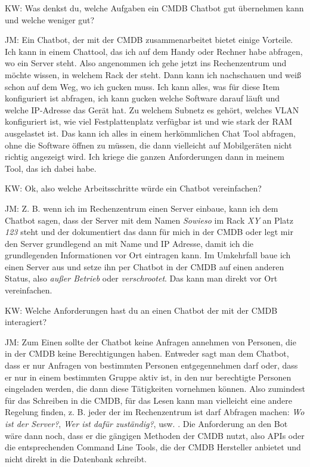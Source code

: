 \begin{list}{X:}{\setlength{\labelsep}{5mm}}
\item[KW:] Was denkst du, welche Aufgaben ein CMDB Chatbot gut übernehmen kann und welche weniger gut?
\item[JM:] Ein Chatbot, der mit der CMDB zusammenarbeitet bietet einige Vorteile. Ich kann in einem Chattool, das ich auf dem Handy oder Rechner habe abfragen, wo ein Server steht. Also angenommen ich gehe jetzt ins Rechenzentrum und möchte wissen, in welchem Rack der steht. Dann kann ich nachschauen und weiß schon auf dem Weg, wo ich gucken muss. Ich kann alles, was für diese Item konfiguriert ist abfragen, ich kann gucken welche Software darauf läuft und welche IP-Adresse das Gerät hat. Zu welchem Subnetz es gehört, welches VLAN konfiguriert ist, wie viel Festplattenplatz verfügbar ist und wie stark der RAM ausgelastet ist. Das kann ich alles in einem herkömmlichen Chat Tool abfragen, ohne die Software öffnen zu müssen, die dann vielleicht auf Mobilgeräten nicht richtig angezeigt wird. Ich kriege die ganzen Anforderungen dann in meinem Tool, das ich dabei habe.
\item[KW:] Ok, also welche Arbeitsschritte würde ein Chatbot vereinfachen?
\item[JM:] Z. B. wenn ich im Rechenzentrum einen Server einbaue, kann ich dem Chatbot sagen, dass der Server mit dem Namen \textit{Sowieso} im Rack \textit{XY} an Platz \textit{123} steht und der dokumentiert das dann für mich in der CMDB oder legt mir den Server grundlegend an mit Name und IP Adresse, damit ich die grundlegenden Informationen vor Ort eintragen kann. Im Umkehrfall baue ich einen Server aus und setze ihn per Chatbot in der CMDB auf einen anderen Status, also \textit{außer Betrieb} oder \textit{verschrootet}. Das kann man direkt vor Ort vereinfachen.
\item[KW:] Welche Anforderungen hast du an einen Chatbot der mit der CMDB interagiert?
\item[JM:] Zum Einen sollte der Chatbot keine Anfragen annehmen von Personen, die in der CMDB keine Berechtigungen haben. Entweder sagt man dem Chatbot, dass er nur Anfragen von bestimmten Personen entgegennehmen darf oder, dass er nur in einem bestimmten Gruppe aktiv ist, in den nur berechtigte Personen eingeladen werden, die dann diese Tätigkeiten vornehmen können. Also zumindest für das Schreiben in die CMDB, für das Lesen kann man vielleicht eine andere Regelung finden, z. B. jeder der im Rechenzentrum ist darf Abfragen machen: \textit{Wo ist der Server?}, \textit{Wer ist dafür zuständig?}, usw. . Die Anforderung an den Bot wäre dann noch, dass er die gängigen Methoden der CMDB nutzt, also APIs oder die entsprechenden Command Line Tools, die der CMDB Hersteller anbietet und nicht direkt in die Datenbank schreibt.

\end{list}
